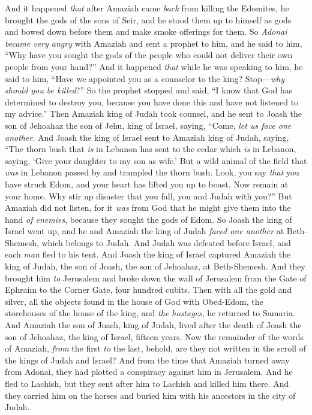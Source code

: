 \begin{biblechapter}
\verse And it happened \textit{that} after Amaziah came \textit{back} from killing the Edomites, he brought the gods of the sons of Seir, and he stood them up to himself as gods and bowed down before them and make smoke offerings for them.
\verse So \textit{Adonai became very angry} with Amaziah and sent a prophet to him, and he said to him, “Why have you sought the gods of the people who could not deliver their own people from your hand?”
\verse And it happened \textit{that} while he was speaking to him, he said to him, “Have we appointed you as a counselor to the king? Stop—\textit{why should you be killed}?” So the prophet stopped and said, “I know that God has determined to destroy you, because you have done this and have not listened to my advice.”
\verse Then Amaziah king of Judah took counsel, and he sent to Joash the son of Jehoahaz the son of Jehu, king of Israel, saying, “Come, \textit{let us face one another}.
\verse And Joash the king of Israel sent to Amaziah king of Judah, saying, “The thorn bush that \textit{is} in Lebanon has sent to the cedar which \textit{is} in Lebanon, saying, ‘Give your daughter to my son as wife.’ But a wild animal of the field that \textit{was} in Lebanon passed by and trampled the thorn bush.
\verse Look, you say \textit{that} you have struck Edom, and your heart has lifted you up to boast. Now remain at your home. Why stir up disaster that you fall, you and Judah with you?”
\verse But Amaziah did not listen, for it \textit{was} from God that he might give them into the hand \textit{of enemies}, because they sought the gods of Edom.
\verse So Joash the king of Israel went up, and he and Amaziah the king of Judah \textit{faced one another} at Beth-Shemesh, which belongs to Judah.
\verse And Judah was defeated before Israel, and each \textit{man} fled to his tent.
\verse And Joash the king of Israel captured Amaziah the king of Judah, the son of Joash, the son of Jehoahaz, at Beth-Shemesh. And they brought him \textit{to} Jerusalem and broke down the wall of Jerusalem from the Gate of Ephraim to the Corner Gate, four hundred cubits.
\verse Then with all the gold and silver, all the objects found in the house of God with Obed-Edom, the storehouses of the house of the king, and \textit{the hostages}, he returned to Samaria.
\verse And Amaziah the son of Joash, king of Judah, lived after the death of Joash the son of Jehoahaz, the king of Israel, fifteen years.
\verse Now the remainder of the words of Amaziah, \textit{from} the first \textit{to} the last, behold, are they not written in the scroll of the kings of Judah and Israel?
\verse And from the time that Amaziah turned away from Adonai, they had plotted a conspiracy against him in Jerusalem. And he fled to Lachish, but they sent after him to Lachish and killed him there.
\verse And they carried him on the horses and buried him with his ancestors in the city of Judah.
\end{biblechapter}

